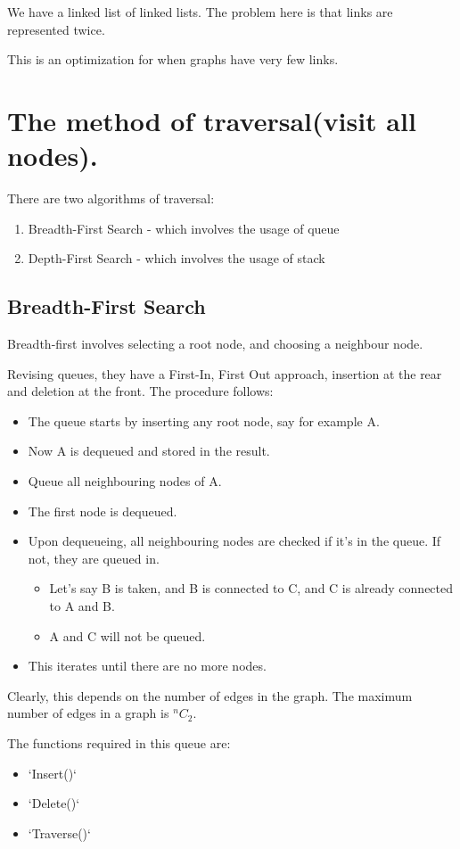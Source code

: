 \documentclass[11pt]{article}
\begin{document}
We have a linked list of linked lists. The problem here is that links are represented twice.

This is an optimization for when graphs have very few links.
\section{The method of traversal(visit all nodes).}
\label{sec:org797ae5d}

There are two algorithms of traversal:
\begin{enumerate}
\item Breadth-First Search - which involves the usage of queue
\item Depth-First Search - which involves the usage of stack
\end{enumerate}
\subsection{Breadth-First Search}
\label{sec:orge100d3c}
Breadth-first involves selecting a root node, and choosing a neighbour node.

Revising queues, they have a First-In, First Out approach, insertion at the rear and deletion at the front.
The procedure follows:
\begin{itemize}
\item The queue starts by inserting any root node, say for example A.
\item Now A is dequeued and stored in the result.
\item Queue all neighbouring nodes of A.
\item The first node is dequeued.
\item Upon dequeueing, all neighbouring nodes are checked if it's in the queue. If not, they are queued in.
\begin{itemize}
\item Let's say B is taken, and B is connected to C, and C is already connected to A and B.
\item A and C will not be queued.
\end{itemize}
\item This iterates until there are no more nodes.
\end{itemize}

Clearly, this depends on the number of edges in the graph. The maximum number of edges in a graph is \(^nC_2\).

The functions required in this queue are:
\begin{itemize}
\item `Insert()`
\item `Delete()`
\item `Traverse()`
\end{itemize}
\end{document}
